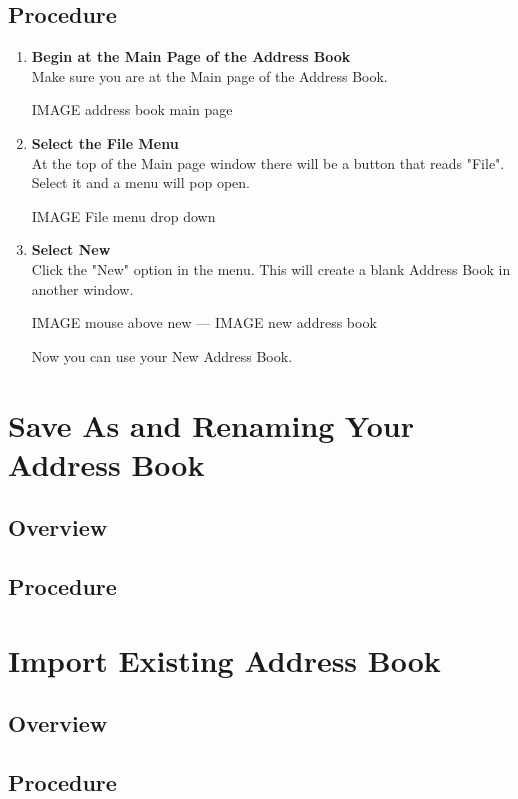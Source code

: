 \documentclass[a4paper, 11pt]{article}
\newlength{\drop}
\begin{document}
\subsection{Procedure}
\begin{enumerate}[label=\textbf{\arabic*})]
    \item{\textbf{Begin at the Main Page of the Address Book}}\\ Make sure you are at the Main page of the Address Book.
    
    IMAGE address book main page
    
    \item{\textbf{Select the File Menu}}\\ At the top of the Main page window there will be a button that reads "File". Select it and a menu will pop open.
    
    IMAGE File menu drop down  
    
    \item{\textbf{Select New}}\\ Click the "New" option in the menu. This will create a blank Address Book in another window.
    
    IMAGE mouse above new --- IMAGE new address book 
    
    Now you can use your New Address Book.
\end{enumerate}

\section{Save As and Renaming Your Address Book}
\subsection{Overview}
\subsection{Procedure}


\section{Import Existing Address Book}
\subsection{Overview}
\subsection{Procedure}
\end{document}
